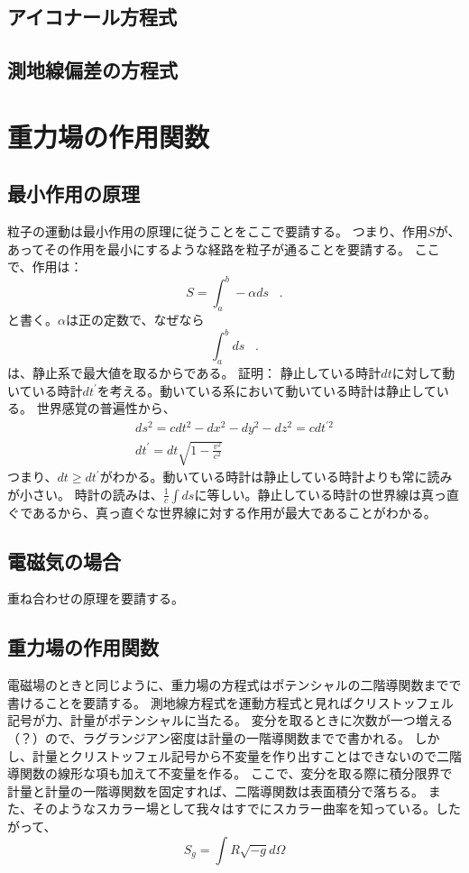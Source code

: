 \documentclass{jsarticle}
\newcommand{\pri}[1]{#1^{\prime}}
\newcommand{\beq}{\begin{equation}}
\newcommand{\beql}[1]{\begin{equation}\label{#1}}
\newcommand{\eeq}{\end{equation}}
\newcommand{\eeqp}{\;\;\;.\end{equation}}
\begin{document}
\subsection{アイコナール方程式}
\subsection{測地線偏差の方程式}
\section{重力場の作用関数}
\subsection{最小作用の原理}
粒子の運動は最小作用の原理に従うことをここで要請する。
つまり、作用$S$が、あってその作用を最小にするような経路を粒子が通ることを要請する。
ここで、作用は：
\beql{eq:S}
    S = \int_{a}^{b} - \alpha ds
\eeqp
と書く。$\alpha$は正の定数で、なぜなら
\beq \int_a^b ds\eeqp は、静止系で最大値を取るからである。
証明：
静止している時計$dt$に対して動いている時計$\pri{dt}$を考える。動いている系において動いている時計は静止している。
世界感覚の普遍性から、
\begin{align} 
    ds^2 = cdt^2 - dx^2 - dy^2 - dz^2 = cdt^{\prime 2}\\
    \pri{dt} = dt \sqrt{1 - \frac{v^2}{c^2}} 
\end{align}
つまり、$dt \geq \pri{dt}$がわかる。動いている時計は静止している時計よりも常に読みが小さい。
時計の読みは、$\frac{1}{c} \int ds$に等しい。静止している時計の世界線は真っ直ぐであるから、真っ直ぐな世界線に対する作用が最大であることがわかる。
\subsection{電磁気の場合}
重ね合わせの原理を要請する。
\subsection{重力場の作用関数}
電磁場のときと同じように、重力場の方程式はポテンシャルの二階導関数までで書けることを要請する。
測地線方程式を運動方程式と見ればクリストッフェル記号が力、計量がポテンシャルに当たる。
変分を取るときに次数が一つ増える（？）ので、ラグランジアン密度は計量の一階導関数までで書かれる。
しかし、計量とクリストッフェル記号から不変量を作り出すことはできないので二階導関数の線形な項も加えて不変量を作る。
ここで、変分を取る際に積分限界で計量と計量の一階導関数を固定すれば、二階導関数は表面積分で落ちる。
また、そのようなスカラー場として我々はすでにスカラー曲率を知っている。したがって、
\beq
    S_g = \int R \sqrt{-g} d\Omega
\eeq
\end{document}
